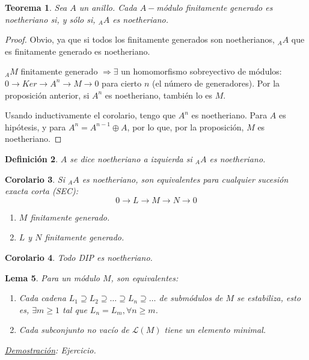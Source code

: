 \documentclass[11pt,a4paper]{article}
\newcommand*{\circled}[2][]{\tikz[baseline=(C.base)]{
	\node[inner sep=0pt] (C) {\vphantom{1g}#2};
	\node[draw, circle, inner sep=1pt, yshift=1pt]
		at (C.center) {\vphantom{1g}};}}
\theoremstyle{break}
\newtheorem{theorem}{Teorema}[section]
\newtheorem{corollary}[theorem]{Corolario}
\newtheorem{lemma}[theorem]{Lema}
\newtheorem{definition}[theorem]{Definición}
\begin{document}
\begin{theorem}
Sea $A$ un anillo. Cada $A-$módulo finitamente generado es noetheriano si, y sólo si, $_{A}A$ es noetheriano.
\end{theorem}

\begin{proof}
\circled{$\Rightarrow$} Obvio, ya que si todos los finitamente generados son noetherianos, $_{A}A$ que es finitamente generado es noetheriano.

\circled{$\Leftarrow$} $_{A}M$ finitamente generado $\Rightarrow \exists$ un homomorfismo sobreyectivo de módulos: $0 \to Ker \to A^{n} \to M \to 0$ para cierto $n$ (el número de generadores). Por la proposición anterior, si $A^{n}$ es noetheriano, también lo es $M$.

Usando inductivamente el corolario, tengo que $A^{n}$ es noetheriano. Para $A$ es hipótesis, y para $A^{n} = A^{n-1} \oplus A$, por lo que, por la proposición, $M$ es noetheriano.
\end{proof}

\begin{definition}
$A$ se dice noetheriano a izquierda si $_{A}A$ es noetheriano.
\end{definition}

\begin{corollary}
Si $_{A}A$ es noetheriano, son equivalentes para cualquier sucesión exacta corta (SEC):
$$0 \to L \to M \to N \to 0$$

\begin{enumerate}
\item $M$ finitamente generado.
\item $L$ y $N$ finitamente generado.
\end{enumerate}
\end{corollary}

\begin{corollary}
Todo DIP es noetheriano.
\end{corollary}


\begin{lemma}
Para un módulo $M$, son equivalentes:
\begin{enumerate}
\item Cada cadena $L_{1} \supseteq L_{2} \supseteq \dots \supseteq L_{n} \supseteq \dots$ de submódulos de $M$ se estabiliza, esto es, $\exists m \geq 1$ tal que $L_{n} = L_{m}, \forall n \geq m$.
\item Cada subconjunto no vacío de $\mathcal{L}(M)$ tiene un elemento minimal.
\end{enumerate}

\underline{Demostración}: Ejercicio.
\end{lemma}
\end{document}

